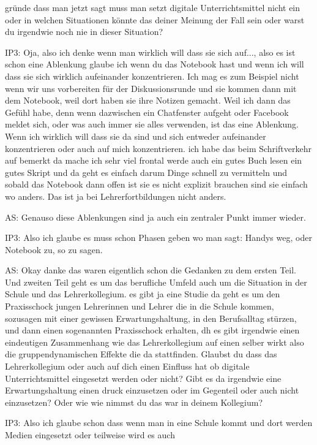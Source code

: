 \documentclass[fontsize=11pt,paper=a4]{scrbook}
\begin{document}
{\begin{itemize*}
gründe dass man jetzt sagt muss man
setzt digitale Unterrichtsmittel nicht
ein oder in welchen Situationen könnte
das deiner Meinung der Fall sein oder 
warst du irgendwie noch nie in dieser
Situation? 
\item[IP3:] Oja, also ich denke wenn man
wirklich will dass sie sich auf..., also es ist schon eine Ablenkung glaube ich wenn
du das Notebook hast und wenn ich will
dass sie sich wirklich aufeinander
konzentrieren. Ich mag es zum Beispiel
nicht wenn wir uns vorbereiten für der
Diskussionsrunde
und sie kommen dann mit dem Notebook, weil
dort haben sie ihre Notizen gemacht. Weil
ich dann das Gefühl habe, denn wenn dazwischen ein
Chatfenster aufgeht oder Facebook
meldet sich, oder was auch immer sie
alles verwenden, ist das eine
Ablenkung. Wenn ich wirklich will dass
sie da sind und sich entweder
aufeinander konzentrieren oder auch auf
mich konzentrieren. ich habe das beim
Schriftverkehr auf bemerkt da mache ich
sehr viel frontal werde auch ein gutes
Buch lesen ein gutes Skript und da geht es
einfach darum Dinge schnell zu
vermitteln und sobald das Notebook dann
offen ist sie es nicht explizit
brauchen sind sie einfach wo anders. Das ist ja bei Lehrerfortbildungen nicht anders.
\item[AS:] Genauso diese Ablenkungen sind ja auch
ein zentraler Punkt immer wieder.
\item[IP3:] Also
ich glaube es muss schon Phasen geben wo
man sagt: Handys weg, oder Notebook zu, so zu sagen.
\item[AS:] Okay danke das waren eigentlich
schon die Gedanken zu dem ersten Teil.
Und zweiten Teil geht es um das
berufliche Umfeld auch um die Situation
in der Schule und das Lehrerkollegium.
es gibt ja eine Studie da geht es um den
Praxisschock jungen Lehrerinnen und
Lehrer die in die Schule kommen, sozusagen mit einer gewissen
Erwartungshaltung, in den Berufsalltag
stürzen, und dann einen sogenannten
Praxisschock erhalten, dh es gibt irgendwie
einen eindeutigen Zusammenhang wie das
Lehrerkollegium auf einen selber wirkt
also die gruppendynamischen Effekte die
da stattfinden.
Glaubst du dass das Lehrerkollegium oder
auch auf dich einen Einfluss hat ob digitale Unterrichtsmittel eingesetzt
werden oder nicht? Gibt es da
irgendwie eine Erwartungshaltung
einen druck einzusetzen oder im Gegenteil
oder auch nicht einzusetzen? Oder wie wie
nimmst du das war in deinem Kollegium?
\item[IP3:] Also ich glaube schon dass wenn man in eine
Schule kommt und dort werden Medien
eingesetzt oder teilweise wird es auch

\end{itemize*}}
\end{document}
